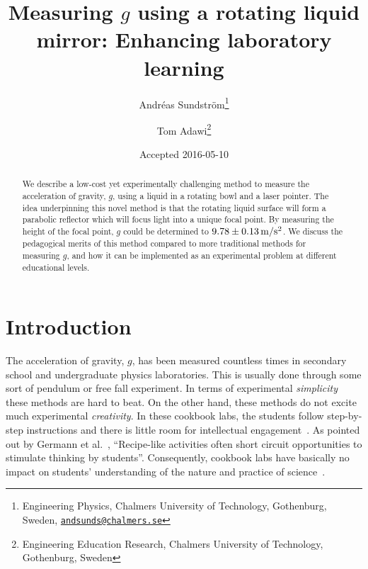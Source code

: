 \documentclass[12pt, a4paper, twocolumn]{article}
\begin{document}
\title{Measuring $g$ using a rotating liquid mirror:
  Enhancing laboratory learning} 

\newcommand{\andsunds}{andsunds@chalmers.se}
\author{Andréas Sundström\footnote{Engineering Physics, Chalmers
    University of Technology, Gothenburg, Sweden,
    \textcolor{blue}{\href{mailto:\andsunds}{\nolinkurl{\andsunds}}} }
\and Tom Adawi\footnote{Engineering Education Research, Chalmers
  University of Technology, Gothenburg, Sweden} 
}
\date{Accepted 2016-05-10}
\maketitle

\begin{abstract}
We describe a low-cost yet experimentally challenging method to measure the acceleration of gravity, $g$, using a liquid in a rotating bowl and a laser pointer. The idea underpinning this novel method is that the rotating liquid surface will form a parabolic reflector which will focus light into a unique focal point. By measuring the height of the focal point, $g$ could be determined to $\unit[9.78 \pm 0.13]{m/s^2}$. We discuss the pedagogical merits of this method compared to more traditional methods for measuring $g$, and how it can be implemented as an experimental problem at different educational levels. 
\end{abstract}


\section{Introduction}

The acceleration of gravity, $g$, has been measured countless times in secondary school and undergraduate physics laboratories. This is usually done through some sort of pendulum or free fall experiment. In terms of experimental \emph{simplicity} these methods are hard to beat. On the other hand, these methods do not excite much experimental \emph{creativity}. In these cookbook labs, the students follow step-by-step instructions and there is little room for intellectual engagement~\cite{Wieman2015}. As pointed out by Germann et al.~\cite{Germann1996}, 
``Recipe-like activities often short circuit opportunities to stimulate thinking by students''. 
Consequently, cookbook labs have basically no impact on students' understanding of the nature and practice of science~\cite{Domin1999}. 
\end{document}
